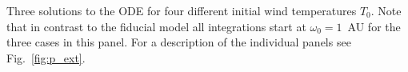 \label{fig:T_0}
Three solutions to the ODE for four different initial wind temperatures $T_0$. Note that in contrast to the fiducial model all integrations start at $\omega_0=1$~AU for the three cases in this panel. For a description of the individual panels see Fig.~\ref{fig:p_ext}. 